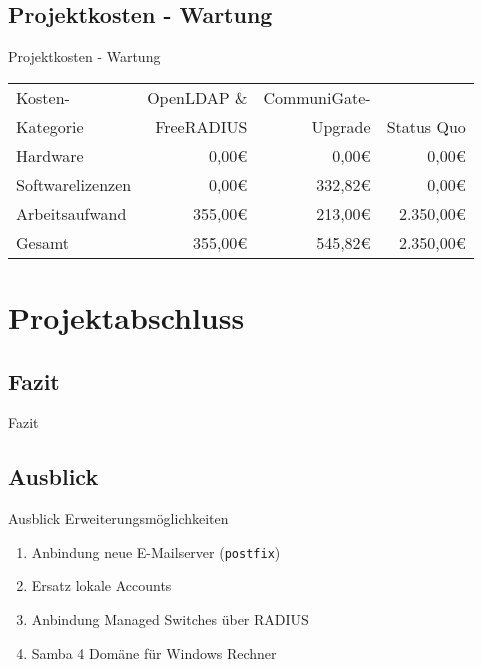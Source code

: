 \documentclass[handout,svgnames]{beamer}
\newcommand{\mcc}[2]{\multicolumn{#1}{|c|}{#2}} %
\begin{document}
\subsection{Projektkosten - Wartung}
\begin{frame}{Projektkosten - Wartung}
	\begin{tabularx}{\textwidth}{|X|r|r|r|}
		\hline
		Kosten-	&	OpenLDAP \& &	CommuniGate- &	\\
		Kategorie	&	FreeRADIUS &	Upgrade &	Status Quo\\
		\hline
		Hardware &	0,00\euro{} &	0,00\euro{} &	0,00\euro{}\\
		\hline
		Softwarelizenzen &	0,00\euro{} &	332,82\euro{} &	0,00\euro{}\\
		\hline
		Arbeitsaufwand &	355,00\euro{} &	213,00\euro{} &	2.350,00\euro{}\\
		\hhline{|=|=|=|=|}
		Gesamt &	355,00\euro{} &	545,82\euro{} &	2.350,00\euro{}\\
		\hline
	\end{tabularx}
\end{frame}


\section{Projektabschluss}
\subsection{Fazit}
\begin{frame}{Fazit}

\end{frame}

\subsection{Ausblick}
\begin{frame}{Ausblick}
	Erweiterungsmöglichkeiten
	\begin{enumerate}
		\item Anbindung neue E-Mailserver (\texttt{postfix})
		\item Ersatz lokale Accounts
		\item Anbindung Managed Switches über RADIUS
		\item Samba 4 Domäne für Windows Rechner
	\end{enumerate}
\end{frame}
\end{document}
